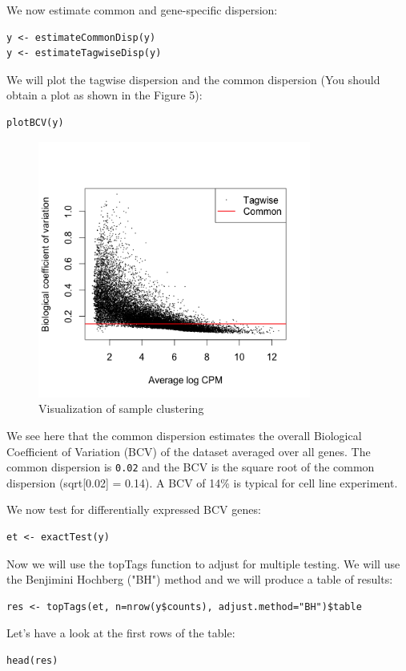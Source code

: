 \begin{steps}
We now estimate common and gene-specific dispersion:
\begin{lstlisting}
y <- estimateCommonDisp(y) 
y <- estimateTagwiseDisp(y) 
\end{lstlisting}

We will plot the tagwise dispersion and the common dispersion (You should obtain a plot as shown in the Figure 5):
\begin{lstlisting}
plotBCV(y)
\end{lstlisting}

\end{steps}
\begin{figure}[H]
\centering
\includegraphics[width=0.8\textwidth]{handout/BCV.png}
\caption{Visualization of sample clustering}
\label{fig:BCV plot}
\end{figure}

\begin{information}
We see here that the common dispersion estimates the overall Biological Coefficient of
Variation (BCV) of the dataset averaged over all genes. The common dispersion is
\texttt{0.02} and the BCV is the square root of the common dispersion (sqrt[0.02] = 0.14).
A BCV of 14\% is typical for cell line experiment.
\end{information}

\begin{steps}
We now test for differentially expressed BCV genes:
\begin{lstlisting}
et <- exactTest(y)
\end{lstlisting}


Now we will use the topTags function to adjust for multiple testing. We will use the
Benjimini Hochberg ("BH") method and we will produce a table of results:
\begin{lstlisting}
res <- topTags(et, n=nrow(y$counts), adjust.method="BH")$table
\end{lstlisting}

Let's have a look at the first rows of the table:
\begin{lstlisting}
head(res)
\end{lstlisting}
\end{steps}

